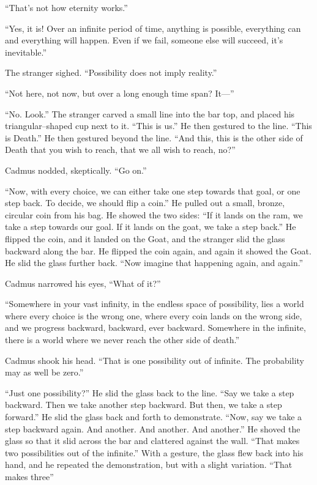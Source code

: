 “That’s not how eternity works.”

“Yes, it is! Over an infinite period of time, anything is possible, everything can and everything will happen. Even if we fail, someone else will succeed, it’s inevitable.”

The stranger sighed. “Possibility does not imply reality.”

“Not here, not now, but over a long enough time span? It\mbox{---}”

“No. Look.” The stranger carved a small line into the bar top, and placed his triangular\mbox{--}shaped cup next to it. “This is us.” He then gestured to the line. “This is Death.” He then gestured beyond the line. “And this, this is the other side of Death that you wish to reach, that we all wish to reach, no?”

Cadmus nodded, skeptically. “Go on.”

“Now, with every choice, we can either take one step towards that goal, or one step back. To decide, we should flip a coin.” He pulled out a small, bronze, circular coin from his bag. He showed the two sides: “If it lands on the ram, we take a step towards our goal. If it lands on the goat, we take a step back.” He flipped the coin, and it landed on the Goat, and the stranger slid the glass backward along the bar. He flipped the coin again, and again it showed the Goat. He slid the glass further back. “Now imagine that happening again, and again.”

Cadmus narrowed his eyes, “What of it?”

“Somewhere in your vast infinity, in the endless space of possibility, lies a world where every choice is the wrong one, where every coin lands on the wrong side, and we progress backward, backward, ever backward. Somewhere in the infinite, there is a world where we never reach the other side of death.”

Cadmus shook his head. “That is one possibility out of infinite. The probability may as well be zero.”

“Just one possibility?” He slid the glass back to the line. “Say we take a step backward. Then we take another step backward. But then, we take a step forward.” He slid the glass back and forth to demonstrate. “Now, say we take a step backward again. And another. And another. And another.” He shoved the glass so that it slid across the bar and clattered against the wall. “That makes two possibilities out of the infinite.” With a gesture, the glass flew back into his hand, and he repeated the demonstration, but with a slight variation. “That makes three{\el}”

